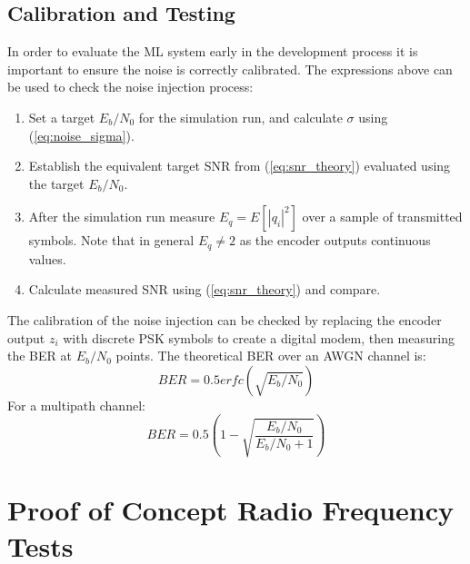 \documentclass{article}
\begin{document}
\subsection{Calibration and Testing}

In order to evaluate the ML system early in the development process it is important to ensure the noise is correctly calibrated. The expressions above can be used to check the noise injection process:
\begin{enumerate}
\item Set a target $E_b/N_0$ for the simulation run, and calculate $\sigma$ using (\ref{eq:noise_sigma}).
\item Establish the equivalent target SNR from (\ref{eq:snr_theory}) evaluated using the target $E_b/N_0$.
\item After the simulation run measure $E_q=E[|q_i|^2]$ over a sample of transmitted symbols.  Note that in general $E_q \ne 2$ as the encoder outputs continuous values.
\item Calculate measured SNR using (\ref{eq:snr_theory}) and compare.
\end{enumerate}

The calibration of the noise injection can be checked by replacing the encoder output $z_i$ with discrete PSK symbols to create a digital modem, then measuring the BER at $E_b/N_0$ points. The theoretical BER over an AWGN channel is:
\begin{equation}
\label{eq:ber_awgn}
BER = 0.5erfc(\sqrt{E_b/N_0})
\end{equation}
For a multipath channel:
\begin{equation}
\label{eq:ber_multipath}
BER = 0.5 \left(1-\sqrt{\frac{E_b/N_0}{E_b/N_0+1}} \right)
\end{equation}

\section{Proof of Concept Radio Frequency Tests}
\end{document}
